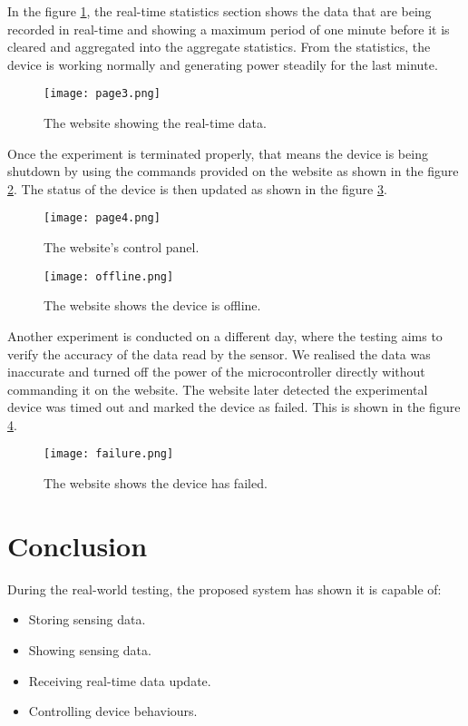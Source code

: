 \documentclass[../thesis.tex]{subfiles}
\begin{document}
In the figure \ref{fig:page3}, the real-time statistics section shows the data that are being recorded in real-time and showing a maximum period of one minute before it is cleared and aggregated into the aggregate statistics. From the statistics, the device is working normally and generating power steadily for the last minute. 

\begin{figure}[!ht]
	\centering
	\texttt{[image: page3.png]}
	\caption{The website showing the real-time data.}
	\label{fig:page3}
\end{figure}


Once the experiment is terminated properly, that means the device is being shutdown by using the commands provided on the website as shown in the figure \ref{fig:page4}. The status of the device is then updated as shown in the figure \ref{fig:offline}. 

\begin{figure}[!ht]
	\centering
	\texttt{[image: page4.png]}
	\caption{The website's control panel.}
	\label{fig:page4}
\end{figure}

\begin{figure}[!ht]
	\centering
	\texttt{[image: offline.png]}
	\caption{The website shows the device is offline.}
	\label{fig:offline}
\end{figure}


Another experiment is conducted on a different day, where the testing aims to verify the accuracy of the data read by the sensor. We realised the data was inaccurate and turned off the power of the microcontroller directly without commanding it on the website. The website later detected the experimental device was timed out and marked the device as failed. This is shown in the figure \ref{fig:failure}.


\begin{figure}[!ht]
	\centering
	\texttt{[image: failure.png]}
	\caption{The website shows the device has failed.}
	\label{fig:failure}
\end{figure}

\section{Conclusion}

During the real-world testing, the proposed system has shown it is capable of:

\begin{itemize}
	\item Storing sensing data.
	\item Showing sensing data.
	\item Receiving real-time data update.
	\item Controlling device behaviours.
\end{itemize}
\end{document}
